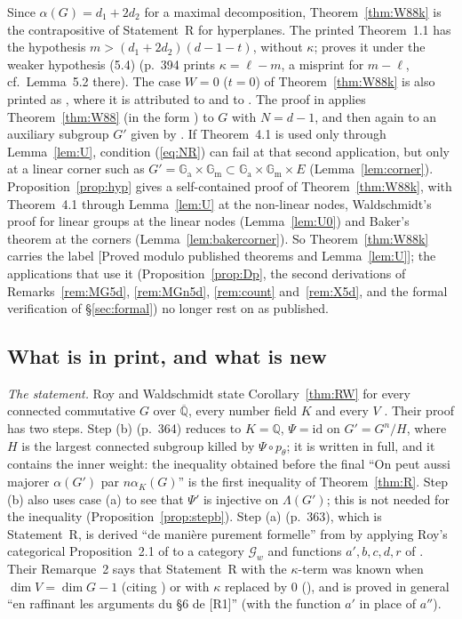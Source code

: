 \documentclass[11pt]{amsart}
\theoremstyle{definition}
\newcommand{\Qb}{\overline{\mathbb{Q}}}
\newcommand{\Q}{\mathbb{Q}}
\newcommand{\Ga}{\mathbb{G}_{\mathrm a}}
\newcommand{\Gm}{\mathbb{G}_{\mathrm m}}
\newcommand{\lab}[1]{\textup{[#1]}}
\newcommand{\LabC}{\lab{Proved modulo published theorems and Lemma~\ref{lem:U}}}
\begin{document}
\noindent Since $\alpha(G)=d_1+2d_2$ for a maximal decomposition, Theorem~\ref{thm:W88k} is the contrapositive of
Statement~R for hyperplanes. The printed Theorem~1.1 has the hypothesis $m>(d_1+2d_2)(d-1-t)$, without $\kappa$;
\cite[\S5d]{W88} proves it under the weaker hypothesis (5.4) (p.~394 prints $\kappa=\ell-m$, a misprint for $m-\ell$, cf.\
Lemma~5.2 there). The case $W=0$ ($t=0$) of Theorem~\ref{thm:W88k} is also printed as \cite[Thm.~5.1]{W05}, where it
is attributed to \cite[Thm.~1.1]{W88} and to \cite[Thm.~4.1]{W90}. The proof in \cite[\S5d]{W88} applies
Theorem~\ref{thm:W88} (in the form \cite[Cor.~5.3]{W88}) to $G$ with $N=d-1$, and then again to an auxiliary subgroup $G'$
given by \cite[Lemma~5.1]{W88}. If Theorem~4.1 is used only through Lemma~\ref{lem:U}, condition (\ref{eq:NR}) can fail at
that second application, but only at a linear corner such as $G'=\Ga\times\Gm\subset\Ga\times\Gm\times E$
(Lemma~\ref{lem:corner}). Proposition~\ref{prop:hyp} gives a self-contained proof of Theorem~\ref{thm:W88k}, with
Theorem~4.1 through Lemma~\ref{lem:U} at the non-linear nodes, Waldschmidt's proof for linear groups at the linear nodes
(Lemma~\ref{lem:U0}) and Baker's theorem at the corners (Lemma~\ref{lem:bakercorner}). So Theorem~\ref{thm:W88k} carries
the label \LabC; the applications that use it (Proposition~\ref{prop:Dp}, the second derivations of
Remarks~\ref{rem:MG5d}, \ref{rem:MGn5d}, \ref{rem:count} and~\ref{rem:X5d}, and the formal verification of
\S\ref{sec:formal}) no longer rest on \cite[\S5d]{W88} as published.

\subsection{What is in print, and what is new}\label{sec:credit}
\emph{The statement.} Roy and Waldschmidt state Corollary~\ref{thm:RW} for every connected commutative $G$ over $\Qb$, every
number field $K$ and every $V$ \cite[Th\'eor\`eme, p.~363]{RW93}. Their proof has two steps. Step (b) (p.~364) reduces to
$K=\Q$, $\Psi=\mathrm{id}$ on $G'=G^n/H$, where $H$ is the largest connected subgroup killed by $\Psi\circ p_\theta$; it is
written in full, and it contains the inner weight: the inequality obtained before the final ``On peut aussi majorer
$\alpha(G')$ par $n\alpha_K(G)$'' is the first inequality of Theorem~\ref{thm:R}. Step (b) also uses case (a) to see that
$\Psi'$ is injective on $\Lambda(G')$; this is not needed for the inequality (Proposition~\ref{prop:stepb}). Step (a)
(p.~363), which is Statement~R, is derived ``de mani\`ere purement formelle'' from \cite[Thm.~4.1]{W88} by applying Roy's
categorical Proposition~2.1 of \cite{R1} to a category $\mathcal G_w$ and functions $a',b,c,d,r$ of \cite[\S6]{R1}.
Their Remarque~2 says that Statement~R with the $\kappa$-term was known when $\dim V=\dim G-1$ (citing \cite[Thm.~1.1]{W88})
or with $\kappa$ replaced by $0$ (\cite[\S6, remarque (i)]{R1}), and is proved in general ``en raffinant les arguments du
\S6 de [R1]'' (with the function $a'$ in place of $a''$).
\end{document}
